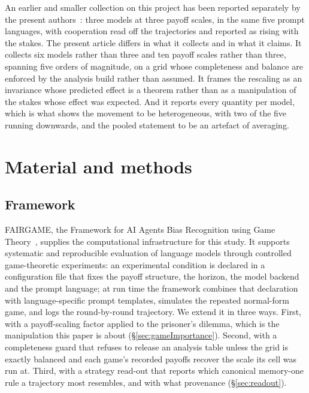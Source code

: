 \documentclass[openacc]{rsproca_new}
\begin{document}
An earlier and smaller collection on this project has been reported separately
by the present authors~\cite{selfpreprint2026scaling}: three models at three
payoff scales, in the same five prompt languages, with cooperation read off the
trajectories and reported as rising with the stakes. The present article
differs in what it collects and in what it claims. It collects six models
rather than three and ten payoff scales rather than three, spanning five orders
of magnitude, on a grid whose completeness and balance are enforced by the
analysis build rather than assumed. It frames the rescaling as an invariance
whose predicted effect is a theorem rather than as a manipulation of the stakes
whose effect was expected. And it reports every quantity per model, which is
what shows the movement to be heterogeneous, with two of the five running
downwards, and the pooled statement to be an artefact of averaging.


\section{Material and methods}\label{sec:methodology}

\subsection{Framework}\label{sec:background}

FAIRGAME, the Framework for AI Agents Bias Recognition using Game
Theory~\cite{buscemi2025fairgame}, supplies the computational infrastructure
for this study. It supports systematic and reproducible evaluation of language
models through controlled game-theoretic experiments: an experimental condition
is declared in a configuration file that fixes the payoff structure, the
horizon, the model backend and the prompt language; at run time the framework
combines that declaration with language-specific prompt templates, simulates
the repeated normal-form game, and logs the round-by-round trajectory. We
extend it in three ways. First, with a payoff-scaling factor applied to the
prisoner's dilemma, which is the manipulation this paper is about
(\S\ref{sec:gameImportance}). Second, with a completeness guard that refuses to
release an analysis table unless the grid is exactly balanced and each game's
recorded payoffs recover the scale its cell was run at. Third, with a strategy
read-out that reports which canonical memory-one rule a trajectory most
resembles, and with what provenance (\S\ref{sec:readout}).
\end{document}
